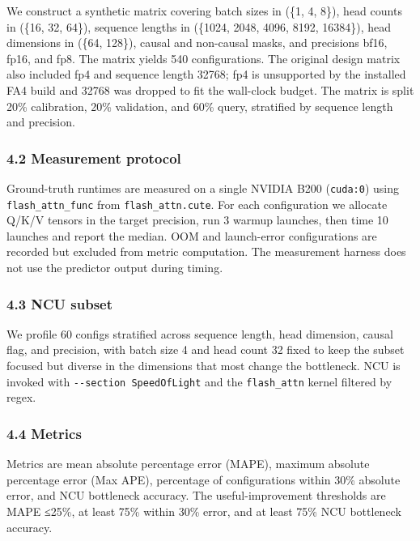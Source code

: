 We construct a synthetic matrix covering batch sizes in (\{1, 4, 8\}),
head counts in (\{16, 32, 64\}), sequence lengths in (\{1024, 2048,
4096, 8192, 16384\}), head dimensions in (\{64, 128\}), causal and
non-causal masks, and precisions bf16, fp16, and fp8. The matrix yields
540 configurations. The original design matrix also included fp4 and
sequence length 32768; fp4 is unsupported by the installed FA4 build and
32768 was dropped to fit the wall-clock budget. The matrix is split 20\%
calibration, 20\% validation, and 60\% query, stratified by sequence
length and precision.

\subsubsection{4.2 Measurement protocol}\label{measurement-protocol}

Ground-truth runtimes are measured on a single NVIDIA B200
(\texttt{cuda:0}) using \texttt{flash\_attn\_func} from
\texttt{flash\_attn.cute}. For each configuration we allocate Q/K/V
tensors in the target precision, run 3 warmup launches, then time 10
launches and report the median. OOM and launch-error configurations are
recorded but excluded from metric computation. The measurement harness
does not use the predictor output during timing.

\subsubsection{4.3 NCU subset}\label{ncu-subset}

We profile 60 configs stratified across sequence length, head dimension,
causal flag, and precision, with batch size 4 and head count 32 fixed to
keep the subset focused but diverse in the dimensions that most change
the bottleneck. NCU is invoked with \texttt{-\/-section\ SpeedOfLight}
and the \texttt{flash\_attn} kernel filtered by regex.

\subsubsection{4.4 Metrics}\label{metrics}

Metrics are mean absolute percentage error (MAPE), maximum absolute
percentage error (Max APE), percentage of configurations within 30\%
absolute error, and NCU bottleneck accuracy. The useful-improvement
thresholds are MAPE ≤25\%, at least 75\% within 30\% error, and at least
75\% NCU bottleneck accuracy.

